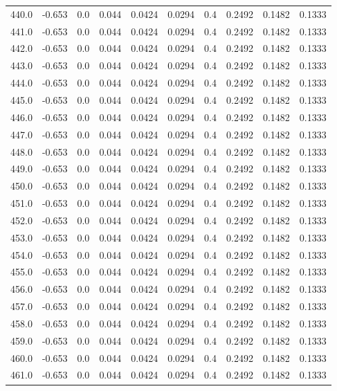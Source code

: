 \begin{longtable}{lrrrrrrrrr}
440.0 & -0.653 & 0.0 & 0.044 & 0.0424 & 0.0294 & 0.4 & 0.2492 & 0.1482 & 0.1333 \\
441.0 & -0.653 & 0.0 & 0.044 & 0.0424 & 0.0294 & 0.4 & 0.2492 & 0.1482 & 0.1333 \\
442.0 & -0.653 & 0.0 & 0.044 & 0.0424 & 0.0294 & 0.4 & 0.2492 & 0.1482 & 0.1333 \\
443.0 & -0.653 & 0.0 & 0.044 & 0.0424 & 0.0294 & 0.4 & 0.2492 & 0.1482 & 0.1333 \\
444.0 & -0.653 & 0.0 & 0.044 & 0.0424 & 0.0294 & 0.4 & 0.2492 & 0.1482 & 0.1333 \\
445.0 & -0.653 & 0.0 & 0.044 & 0.0424 & 0.0294 & 0.4 & 0.2492 & 0.1482 & 0.1333 \\
446.0 & -0.653 & 0.0 & 0.044 & 0.0424 & 0.0294 & 0.4 & 0.2492 & 0.1482 & 0.1333 \\
447.0 & -0.653 & 0.0 & 0.044 & 0.0424 & 0.0294 & 0.4 & 0.2492 & 0.1482 & 0.1333 \\
448.0 & -0.653 & 0.0 & 0.044 & 0.0424 & 0.0294 & 0.4 & 0.2492 & 0.1482 & 0.1333 \\
449.0 & -0.653 & 0.0 & 0.044 & 0.0424 & 0.0294 & 0.4 & 0.2492 & 0.1482 & 0.1333 \\
450.0 & -0.653 & 0.0 & 0.044 & 0.0424 & 0.0294 & 0.4 & 0.2492 & 0.1482 & 0.1333 \\
451.0 & -0.653 & 0.0 & 0.044 & 0.0424 & 0.0294 & 0.4 & 0.2492 & 0.1482 & 0.1333 \\
452.0 & -0.653 & 0.0 & 0.044 & 0.0424 & 0.0294 & 0.4 & 0.2492 & 0.1482 & 0.1333 \\
453.0 & -0.653 & 0.0 & 0.044 & 0.0424 & 0.0294 & 0.4 & 0.2492 & 0.1482 & 0.1333 \\
454.0 & -0.653 & 0.0 & 0.044 & 0.0424 & 0.0294 & 0.4 & 0.2492 & 0.1482 & 0.1333 \\
455.0 & -0.653 & 0.0 & 0.044 & 0.0424 & 0.0294 & 0.4 & 0.2492 & 0.1482 & 0.1333 \\
456.0 & -0.653 & 0.0 & 0.044 & 0.0424 & 0.0294 & 0.4 & 0.2492 & 0.1482 & 0.1333 \\
457.0 & -0.653 & 0.0 & 0.044 & 0.0424 & 0.0294 & 0.4 & 0.2492 & 0.1482 & 0.1333 \\
458.0 & -0.653 & 0.0 & 0.044 & 0.0424 & 0.0294 & 0.4 & 0.2492 & 0.1482 & 0.1333 \\
459.0 & -0.653 & 0.0 & 0.044 & 0.0424 & 0.0294 & 0.4 & 0.2492 & 0.1482 & 0.1333 \\
460.0 & -0.653 & 0.0 & 0.044 & 0.0424 & 0.0294 & 0.4 & 0.2492 & 0.1482 & 0.1333 \\
461.0 & -0.653 & 0.0 & 0.044 & 0.0424 & 0.0294 & 0.4 & 0.2492 & 0.1482 & 0.1333 \\

\end{longtable}
